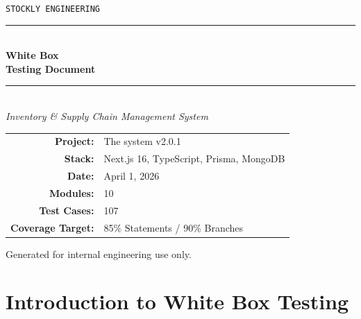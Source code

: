 \documentclass[12pt,a4paper]{report}
\begin{document}

\begin{titlepage}
  \pagecolor{primary}
  \color{white}
  \centering
  \vspace*{3cm}

  {\fontsize{14}{18}\selectfont\texttt{STOCKLY ENGINEERING}}\\[0.5cm]
  \rule{12cm}{1pt}\\[0.8cm]
  {\fontsize{36}{44}\selectfont\bfseries White Box\\[0.3cm]Testing Document}\\[0.8cm]
  \rule{12cm}{1pt}\\[1cm]

  {\Large\itshape Inventory \& Supply Chain Management System}\\[2cm]

  \begin{tabular}{rl}
    \textbf{Project:}   & The system v2.0.1 \\[4pt]
    \textbf{Stack:}     & Next.js 16, TypeScript, Prisma, MongoDB \\[4pt]
    \textbf{Date:}      & April 1, 2026 \\[4pt]
    \textbf{Modules:}   & 10 \\[4pt]
    \textbf{Test Cases:}& 107 \\[4pt]
    \textbf{Coverage Target:} & 85\% Statements / 90\% Branches \\
  \end{tabular}

  \vfill
  {\small\color{white!70} Generated for internal engineering use only.}
\end{titlepage}
\pagecolor{white}\color{black}

\tableofcontents
\newpage


\chapter{Introduction to White Box Testing}
\end{document}
